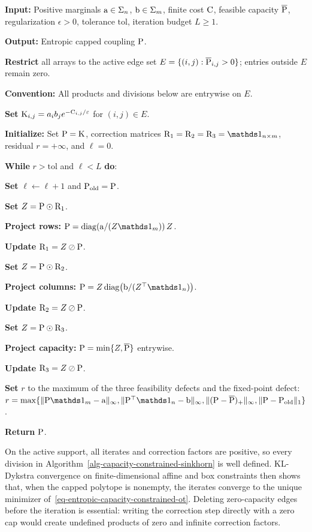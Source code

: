 \begin{algH}\label{alg-capacity-constrained-sinkhorn}
\textbf{Input:} Positive marginals $\a\in\simplex_n$, $\b\in\simplex_m$, finite cost $\C$, feasible capacity $\overline{\P}$, regularization $\epsilon>0$, tolerance $\mathrm{tol}$, iteration budget $L\geq1$.

\textbf{Output:} Entropic capped coupling $\P$.

\textbf{Restrict} all arrays to the active edge set $E=\{(i,j):\overline{\P}_{i,j}>0\}$; entries outside $E$ remain zero.

\textbf{Convention:} All products and divisions below are entrywise on $E$.

\textbf{Set} $\K_{i,j}=a_i b_j e^{-\C_{i,j}/\epsilon}$ for $(i,j)\in E$.

\textbf{Initialize:} Set $\P=\K$, correction matrices $\R_1=\R_2=\R_3=\ones_{n\times m}$, residual $r=+\infty$, and $\ell=0$.

\textbf{While} $r>\mathrm{tol}$ and $\ell<L$ \textbf{do}:
\begin{algblock}
\textbf{Set} $\ell\leftarrow \ell+1$ and $\P_{\rm old}=\P$.

\textbf{Set} $Z=\P\odot \R_1$.

\textbf{Project rows:} $\P= \diag\!\left(\a/(Z\ones_m)\right) Z$.

\textbf{Update} $\R_1=Z\oslash \P$.

\textbf{Set} $Z=\P\odot \R_2$.

\textbf{Project columns:} $\P= Z\diag\!\left(\b/(Z^\top\ones_n)\right)$.

\textbf{Update} $\R_2=Z\oslash \P$.

\textbf{Set} $Z=\P\odot \R_3$.

\textbf{Project capacity:} $\P=\min\{Z,\overline{\P}\}$ entrywise.

\textbf{Update} $\R_3=Z\oslash \P$.

\textbf{Set} $r$ to the maximum of the three feasibility defects and the fixed-point defect:
\(r=\max\{\|\P\ones_m-\a\|_\infty,\|\P^\top\ones_n-\b\|_\infty,\|(\P-\overline{\P})_+\|_\infty,\|\P-\P_{\rm old}\|_1\}\).
\end{algblock}

\textbf{Return} $\P$.
\end{algH}

On the active support, all iterates and correction factors are positive, so every division in Algorithm~\ref{alg-capacity-constrained-sinkhorn} is well defined. KL-Dykstra convergence on finite-dimensional affine and box constraints then shows that, when the capped polytope is nonempty, the iterates converge to the unique minimizer of~\eqref{eq-entropic-capacity-constrained-ot}. Deleting zero-capacity edges before the iteration is essential: writing the correction step directly with a zero cap would create undefined products of zero and infinite correction factors.

